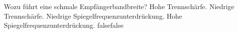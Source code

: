     {Wozu führt eine schmale Empfängerbandbreite?}
    {Hohe Trennschärfe.}
    {Niedrige Trennschärfe.}
    {Niedrige Spiegelfrequenzunterdrückung.}
    {Hohe Spiegelfrequenzunterdrückung.}
    {false}{false}